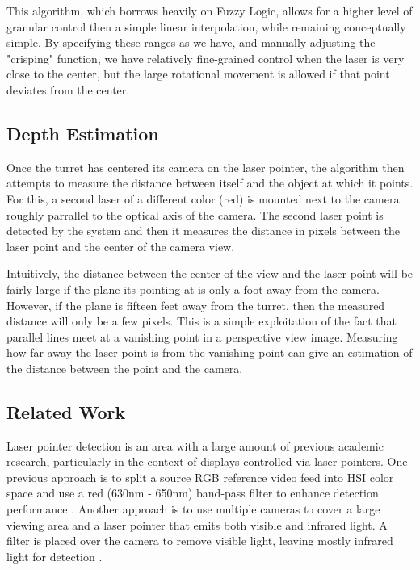 \documentclass[10pt,twocolumn,letterpaper]{article}
\begin{document}
This algorithm, which borrows heavily on Fuzzy Logic, allows for a higher level of granular control then a simple linear interpolation, while remaining conceptually simple. By specifying these ranges as we have, and manually adjusting the "crisping" function, we have relatively fine-grained control when the laser is very close to the center, but the large rotational movement is allowed if that point deviates from the center.

\subsection{Depth Estimation}

Once the turret has centered its camera on the laser pointer, the algorithm then attempts to measure the distance between itself and the object at which it points.  For this, a second laser of a different color (red) is mounted next to the camera roughly parrallel to the optical axis of the camera.  The second laser point is detected by the system and then it measures the distance in pixels between the laser point and the center of the camera view. 

Intuitively, the distance between the center of the view and the laser point will be fairly large if the plane its pointing at is only a foot away from the camera.  However, if the plane is fifteen feet away from the turret, then the measured distance will only be a few pixels.  This is a simple exploitation of the fact that parallel lines meet at a vanishing point in a perspective view image. Measuring how far away the laser point is from the vanishing point can give an estimation of the distance between the point and the camera. 

\subsection{Related Work}

Laser pointer detection is an area with a large amount of previous academic research, particularly in the context of displays controlled via laser pointers.  One previous approach is to split a source RGB reference video feed into HSI color space and use a red (630nm - 650nm) band-pass filter to enhance detection performance \cite{DBLP:conf/hci/KimLLL07}.  Another approach is to use multiple cameras to cover a large viewing area and a laser pointer that emits both visible and infrared light.  A filter is placed over the camera to remove visible light, leaving mostly infrared light for detection \cite{König200715925196}.
\end{document}
